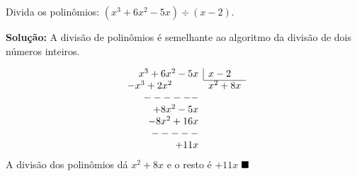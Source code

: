 \begin{texemplo}
Divida os polinômios: $(x^3 + 6x^2 - 5x) \div (x - 2)$.

\textbf{Solução:}
A divisão de polinômios é semelhante ao algoritmo da divisão de dois números inteiros.

\[
\begin{array}{rl}
x^3 + 6x^2 - 5x & \myrule{x-2} \\
\cline{2-2}
-x^3 + 2x^2~~~~~~~~ & x^2  + 8x \\
------\\
+8x^2-5x\\
-8x^2+16x\\
-----\\
+11x
\end{array}
\]
A divisão dos polinômios dá $x^2  + 8x$ e o resto é $+11x$ $\qedsymbol$

\end{texemplo}

